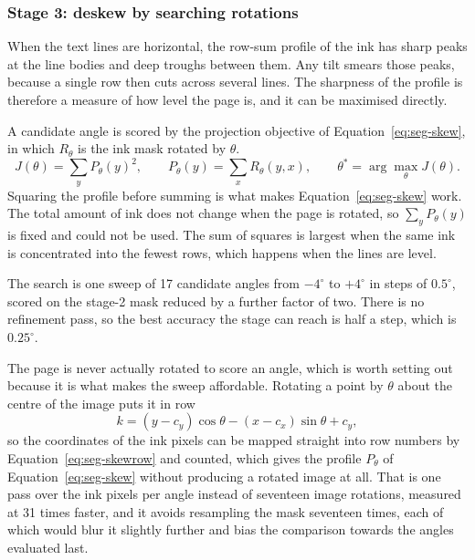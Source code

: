 \subsubsection{Stage 3: deskew by searching rotations}

When the text lines are horizontal, the row-sum profile of the ink has sharp peaks at the line bodies and deep troughs between them. Any tilt smears those peaks, because a single row then cuts across several lines. The sharpness of the profile is therefore a measure of how level the page is, and it can be maximised directly.

A candidate angle is scored by the projection objective of Equation~\ref{eq:seg-skew}, in which $R_\theta$ is the ink mask rotated by $\theta$.
\begin{equation}
J(\theta)=\sum_y P_\theta(y)^2,\qquad P_\theta(y)=\sum_x R_\theta(y,x),\qquad \theta^*=\arg\max_\theta J(\theta).
\label{eq:seg-skew}
\end{equation}
Squaring the profile before summing is what makes Equation~\ref{eq:seg-skew} work. The total amount of ink does not change when the page is rotated, so $\sum_yP_\theta(y)$ is fixed and could not be used. The sum of squares is largest when the same ink is concentrated into the fewest rows, which happens when the lines are level.

The search is one sweep of 17 candidate angles from $-4^\circ$ to $+4^\circ$ in steps of $0.5^\circ$, scored on the stage-2 mask reduced by a further factor of two. There is no refinement pass, so the best accuracy the stage can reach is half a step, which is $0.25^\circ$.

The page is never actually rotated to score an angle, which is worth setting out because it is what makes the sweep affordable. Rotating a point by $\theta$ about the centre of the image puts it in row
\begin{equation}
k=(y-c_y)\cos\theta-(x-c_x)\sin\theta+c_y,
\label{eq:seg-skewrow}
\end{equation}
so the coordinates of the ink pixels can be mapped straight into row numbers by Equation~\ref{eq:seg-skewrow} and counted, which gives the profile $P_\theta$ of Equation~\ref{eq:seg-skew} without producing a rotated image at all. That is one pass over the ink pixels per angle instead of seventeen image rotations, measured at 31 times faster, and it avoids resampling the mask seventeen times, each of which would blur it slightly further and bias the comparison towards the angles evaluated last.

